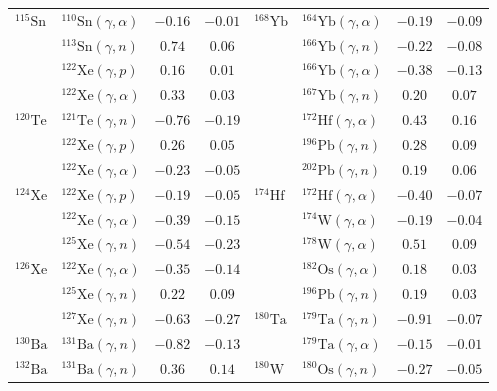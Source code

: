 \begin{table}
\begin{tabular}{llcc|llcc}
    $^{115}\mathrm{Sn}$ & $^{110}\mathrm{Sn}(\gamma,\alpha)$ & $-0.16$ & $-0.01$ & $^{168}\mathrm{Yb}$ & $^{164}\mathrm{Yb}(\gamma,\alpha)$ & $-0.19$ & $-0.09$ \\ 
    $ $ & $^{113}\mathrm{Sn}(\gamma,n)$ & $0.74$ & $0.06$ & $ $ & $^{166}\mathrm{Yb}(\gamma,n)$ & $-0.22$ & $-0.08$ \\ 
    $ $ & $^{122}\mathrm{Xe}(\gamma,p)$ & $0.16$ & $0.01$ & $ $ & $^{166}\mathrm{Yb}(\gamma,\alpha)$ & $-0.38$ & $-0.13$ \\ 
    $ $ & $^{122}\mathrm{Xe}(\gamma,\alpha)$ & $0.33$ & $0.03$ & $ $ & $^{167}\mathrm{Yb}(\gamma,n)$ & $0.20$ & $0.07$ \\ 
    $^{120}\mathrm{Te}$ & $^{121}\mathrm{Te}(\gamma,n)$ & $-0.76$ & $-0.19$ & $ $ & $^{172}\mathrm{Hf}(\gamma,\alpha)$ & $0.43$ & $0.16$ \\ 
    $ $ & $^{122}\mathrm{Xe}(\gamma,p)$ & $0.26$ & $0.05$ & $ $ & $^{196}\mathrm{Pb}(\gamma,n)$ & $0.28$ & $0.09$ \\ 
    $ $ & $^{122}\mathrm{Xe}(\gamma,\alpha)$ & $-0.23$ & $-0.05$ & $ $ & $^{202}\mathrm{Pb}(\gamma,n)$ & $0.19$ & $0.06$ \\ 
    $^{124}\mathrm{Xe}$ & $^{122}\mathrm{Xe}(\gamma,p)$ & $-0.19$ & $-0.05$ & $^{174}\mathrm{Hf}$ & $^{172}\mathrm{Hf}(\gamma,\alpha)$ & $-0.40$ & $-0.07$ \\ 
    $ $ & $^{122}\mathrm{Xe}(\gamma,\alpha)$ & $-0.39$ & $-0.15$ & $ $ & $^{174}\mathrm{W}(\gamma,\alpha)$ & $-0.19$ & $-0.04$ \\ 
    $ $ & $^{125}\mathrm{Xe}(\gamma,n)$ & $-0.54$ & $-0.23$ & $ $ & $^{178}\mathrm{W}(\gamma,\alpha)$ & $0.51$ & $0.09$ \\ 
    $^{126}\mathrm{Xe}$ & $^{122}\mathrm{Xe}(\gamma,\alpha)$ & $-0.35$ & $-0.14$ & $ $ & $^{182}\mathrm{Os}(\gamma,\alpha)$ & $0.18$ & $0.03$ \\ 
    $ $ & $^{125}\mathrm{Xe}(\gamma,n)$ & $0.22$ & $0.09$ & $ $ & $^{196}\mathrm{Pb}(\gamma,n)$ & $0.19$ & $0.03$ \\ 
    $ $ & $^{127}\mathrm{Xe}(\gamma,n)$ & $-0.63$ & $-0.27$ & $^{180}\mathrm{Ta}$ & $^{179}\mathrm{Ta}(\gamma,n)$ & $-0.91$ & $-0.07$ \\ 
    $^{130}\mathrm{Ba}$ & $^{131}\mathrm{Ba}(\gamma,n)$ & $-0.82$ & $-0.13$ & $ $ & $^{179}\mathrm{Ta}(\gamma,\alpha)$ & $-0.15$ & $-0.01$ \\ 
    $^{132}\mathrm{Ba}$ & $^{131}\mathrm{Ba}(\gamma,n)$ & $0.36$ & $0.14$ & $^{180}\mathrm{W}$ & $^{180}\mathrm{Os}(\gamma,n)$ & $-0.27$ & $-0.05$ \\ 

\end{tabular}
\end{table}
